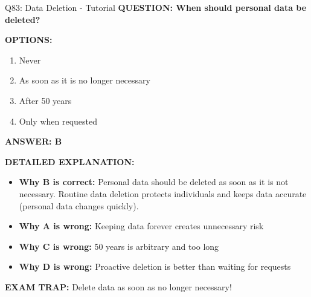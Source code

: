\documentclass[8pt]{beamer}
\begin{document}
	\begin{frame}{Q83: Data Deletion - Tutorial}
		\fontsize{6.5}{7.5}\selectfont
		\textbf{QUESTION: When should personal data be deleted?}
		
		\vspace{0.1cm}
		\textbf{OPTIONS:}
		\begin{enumerate}
			\item Never
			\item As soon as it is no longer necessary
			\item After 50 years
			\item Only when requested
		\end{enumerate}
		
		\vspace{0.1cm}
		\textcolor{myblue}{\textbf{ANSWER: B}}
		
		\vspace{0.1cm}
		\textbf{DETAILED EXPLANATION:}
		\begin{itemize}
			\item \textbf{Why B is correct:} Personal data should be deleted as soon as it is not necessary. Routine data deletion protects individuals and keeps data accurate (personal data changes quickly).
			\item \textbf{Why A is wrong:} Keeping data forever creates unnecessary risk
			\item \textbf{Why C is wrong:} 50 years is arbitrary and too long
			\item \textbf{Why D is wrong:} Proactive deletion is better than waiting for requests
		\end{itemize}
		
		\textcolor{myred}{\textbf{EXAM TRAP:}} Delete data \textcolor{myblue}{as soon as no longer necessary}!
	\end{frame}
	
\end{document}
